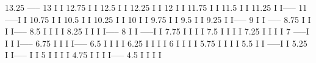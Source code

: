 \begin{Listing}
       13.25                             -----
       13                                I   I
       12.75                             I   I
       12.5                              I   I
       12.25                             I   I
       12                                I   I
       11.75                             I   I
       11.5                              I   I
       11.25                             I   I-----
       11                           -----I        I
       10.75                        I             I
       10.5                         I             I
       10.25                        I             I
       10                           I             I
        9.75                        I             I
        9.5                         I             I
        9.25                        I             I-----
        9                           I                  I                    -----
        8.75                        I                  I                    I   I-----
        8.5                         I                  I                    I        I
        8.25                        I                  I                    I        I-----
        8                           I                  I               -----I             I
        7.75                        I                  I               I                  I
        7.5                         I                  I               I                  I
        7.25                        I                  I               I                  I
        7                      -----I                  I               I                  I-----
        6.75                   I                       I               I                       I-----
        6.5                    I                       I               I                            I
        6.25                   I                       I               I                            I
        6                      I                       I               I                            I
        5.75                   I                       I               I                            I
        5.5                    I                       I          -----I                            I
        5.25                   I                       I-----     I                                 I
        5                      I                            I     I                                 I
        4.75                   I                            I     I                                 I-----
        4.5                    I                            I     I                                      I

\end{Listing}
